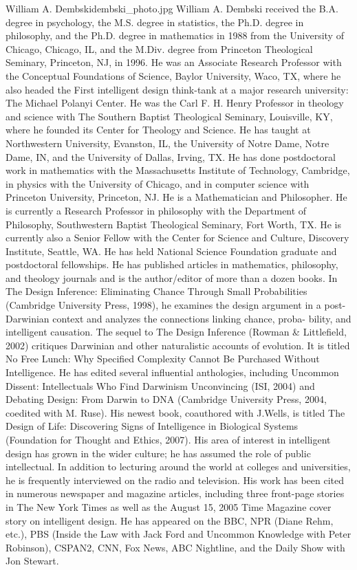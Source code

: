 \begin{authorbio}{William A. Dembski}{dembski_photo.jpg}
William A. Dembski received the B.A. degree in psychology, the M.S. degree in statistics, the
Ph.D. degree in philosophy, and the Ph.D. degree in mathematics in 1988 from the University of
Chicago, Chicago, IL, and the M.Div. degree from Princeton Theological Seminary, Princeton,
NJ, in 1996. He was an Associate Research Professor with the Conceptual Foundations of Science, 
Baylor University, Waco, TX, where he also headed the First intelligent design think-tank
at a major research university: The Michael Polanyi Center. He was the Carl F. H. Henry Professor 
in theology and science with The Southern Baptist Theological Seminary, Louisville, KY,
where he founded its Center for Theology and Science. He has taught at Northwestern University, 
Evanston, IL, the University of Notre Dame, Notre Dame, IN, and the University of Dallas,
Irving, TX. He has done postdoctoral work in mathematics with the Massachusetts Institute of
Technology, Cambridge, in physics with the University of Chicago, and in computer science with
Princeton University, Princeton, NJ. He is a Mathematician and Philosopher. He is currently a
Research Professor in philosophy with the Department of Philosophy, Southwestern Baptist Theological 
Seminary, Fort Worth, TX. He is currently also a Senior Fellow with the Center for Science
and Culture, Discovery Institute, Seattle, WA. He has held National Science Foundation graduate
and postdoctoral fellowships. He has published articles in mathematics, philosophy, and theology
journals and is the author/editor of more than a dozen books. In The Design Inference: Eliminating 
Chance Through Small Probabilities (Cambridge University Press, 1998), he examines the
design argument in a post-Darwinian context and analyzes the connections linking chance, proba-
bility, and intelligent causation. The sequel to The Design Inference (Rowman \& Littlefield, 2002)
critiques Darwinian and other naturalistic accounts of evolution. It is titled No Free Lunch: Why
Specified Complexity Cannot Be Purchased Without Intelligence. He has edited several influential
anthologies, including Uncommon Dissent: Intellectuals Who Find Darwinism Unconvincing (ISI,
2004) and Debating Design: From Darwin to DNA (Cambridge University Press, 2004, coedited
with M. Ruse). His newest book, coauthored with J.Wells, is titled The Design of Life: Discovering
Signs of Intelligence in Biological Systems (Foundation for Thought and Ethics, 2007). His area
of interest in intelligent design has grown in the wider culture; he has assumed the role of public
intellectual. In addition to lecturing around the world at colleges and universities, he is frequently
interviewed on the radio and television. His work has been cited in numerous newspaper and
magazine articles, including three front-page stories in The New York Times as well as the August
15, 2005 Time Magazine cover story on intelligent design. He has appeared on the BBC, NPR
(Diane Rehm, etc.), PBS (Inside the Law with Jack Ford and Uncommon Knowledge with Peter
Robinson), CSPAN2, CNN, Fox News, ABC Nightline, and the Daily Show with Jon Stewart.
\end{authorbio}



